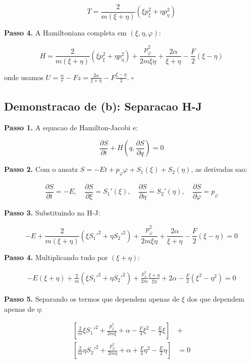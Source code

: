 \documentclass[12pt,a4paper,oneside]{article}
\begin{document}
$$T = \frac{2}{m(\xi+\eta)}\left(\xi p_\xi^2 + \eta p_\eta^2\right)$$

\textbf{Passo 4.} A Hamiltoniana completa em $(\xi,\eta,\varphi)$:

\begin{equation}\label{eq:hj_hamiltonian}
\boxed{H = \frac{2}{m(\xi+\eta)}\left(\xi p_\xi^2 + \eta p_\eta^2\right) +
\frac{p_\varphi^2}{2m\xi\eta} + \frac{2\alpha}{\xi+\eta} - \frac{F}{2}(\xi-\eta)}
\end{equation}

onde usamos $U = \frac{\alpha}{r} - Fz = \frac{2\alpha}{\xi+\eta} - F\frac{\xi-\eta}{2}$.
$\square$

\subsection*{Demonstracao de (b): Separacao H-J}

\textbf{Passo 1.} A equacao de Hamilton-Jacobi e:

$$\frac{\partial S}{\partial t} + H\left(q, \frac{\partial S}{\partial q}\right) = 0$$

\textbf{Passo 2.} Com o ansatz $S = -Et + p_\varphi\varphi + S_1(\xi) + S_2(\eta)$,
as derivadas sao:

$$\frac{\partial S}{\partial t} = -E, \quad
\frac{\partial S}{\partial \xi} = S_1'(\xi), \quad
\frac{\partial S}{\partial \eta} = S_2'(\eta), \quad
\frac{\partial S}{\partial \varphi} = p_\varphi$$

\textbf{Passo 3.} Substituindo na H-J:

$$-E + \frac{2}{m(\xi+\eta)}\left(\xi S_1'^2 + \eta S_2'^2\right) +
\frac{p_\varphi^2}{2m\xi\eta} + \frac{2\alpha}{\xi+\eta} - \frac{F}{2}(\xi-\eta) = 0$$

\textbf{Passo 4.} Multiplicando tudo por $(\xi+\eta)$:

\begin{align*}
-E(\xi+\eta) + \frac{2}{m}(\xi S_1'^2 + \eta S_2'^2) +
\frac{p_\varphi^2}{2m}\frac{\xi+\eta}{\xi\eta} +
2\alpha - \frac{F}{2}(\xi^2-\eta^2) = 0
\end{align*}

\textbf{Passo 5.} Separando os termos que dependem apenas de $\xi$ dos que
dependem apenas de $\eta$:

\begin{align*}
\left[\frac{2}{m}\xi S_1'^2 + \frac{p_\varphi^2}{2m\xi} + \alpha -
\frac{F}{4}\xi^2 - \frac{E}{2}\xi\right] &+ \\
\left[\frac{2}{m}\eta S_2'^2 + \frac{p_\varphi^2}{2m\eta} + \alpha +
\frac{F}{4}\eta^2 - \frac{E}{2}\eta\right] &= 0
\end{align*}
\end{document}
